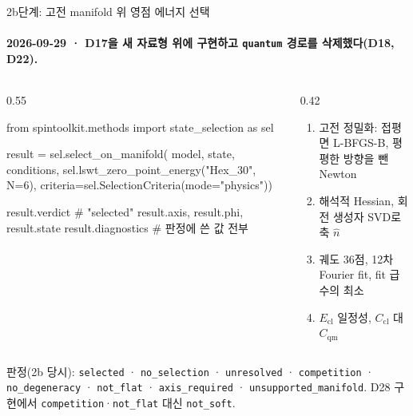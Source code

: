 \begin{frame}[fragile,label=stage2b-api]{2b단계: 고전 manifold 위 영점 에너지 선택}
  \framesubtitle{2026-09-29 · D17을 새 자료형 위에 구현하고 \texttt{quantum} 경로를 삭제했다(D18, D22).}
  \begin{columns}[T,onlytextwidth]
    \begin{column}{0.55\textwidth}
\begin{semiverbatim}\scriptsize
from spintoolkit.methods import state_selection as sel

result = sel.select_on_manifold(
    model, state, conditions,
    sel.lswt_zero_point_energy("Hex_30", N=6),
    criteria=sel.SelectionCriteria(mode="physics"))

result.verdict      # "selected"
result.axis, result.phi, result.state
result.diagnostics  # 판정에 쓴 값 전부
\end{semiverbatim}
    \end{column}
    \begin{column}{0.42\textwidth}
      \small
      \begin{enumerate}\setlength{\itemsep}{0.1em}
        \item 고전 정밀화: 접평면 L-BFGS-B, 평평한 방향을 뺀 Newton
        \item 해석적 Hessian, 회전 생성자 SVD로 축 $\hat n$
        \item 궤도 36점, 12차 Fourier fit, fit 급수의 최소
        \item $E_{\mathrm{cl}}$ 일정성, $C_{\mathrm{cl}}$ 대 $C_{\mathrm{qm}}$
      \end{enumerate}
    \end{column}
  \end{columns}
  \par\medskip
  \small 판정(2b 당시): \texttt{selected} · \texttt{no\_selection} · \texttt{unresolved} · \texttt{competition} · \texttt{no\_degeneracy} · \texttt{not\_flat} · \texttt{axis\_required} · \texttt{unsupported\_manifold}. D28 구현에서 \texttt{competition}·\texttt{not\_flat} 대신 \texttt{not\_soft}.
  \par\medskip
\end{frame}

